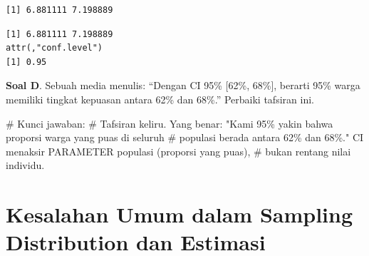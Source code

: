 \documentclass[
  indonesian,
  letterpaper,
]{book}
\newenvironment{Shaded}{\begin{snugshade}}{\end{snugshade}}
\newcommand{\CommentTok}[1]{\textcolor[rgb]{0.37,0.37,0.37}{#1}}
\newcommand{\FunctionTok}[1]{\textcolor[rgb]{0.28,0.35,0.67}{#1}}
\newcommand{\NormalTok}[1]{\textcolor[rgb]{0.00,0.23,0.31}{#1}}
\newcommand{\SpecialCharTok}[1]{\textcolor[rgb]{0.37,0.37,0.37}{#1}}
\begin{document}
\begin{verbatim}
[1] 6.881111 7.198889
\end{verbatim}

\begin{Shaded}
\end{Shaded}

\begin{verbatim}
[1] 6.881111 7.198889
attr(,"conf.level")
[1] 0.95
\end{verbatim}

\textbf{Soal D}. Sebuah media menulis: ``Dengan CI 95\% {[}62\%,
68\%{]}, berarti 95\% warga memiliki tingkat kepuasan antara 62\% dan
68\%.'' Perbaiki tafsiran ini.

\begin{Shaded}
\begin{Highlighting}[]
\CommentTok{\# Kunci jawaban:}
\CommentTok{\# Tafsiran keliru. Yang benar: "Kami 95\% yakin bahwa proporsi warga yang puas di seluruh}
\CommentTok{\# populasi berada antara 62\% dan 68\%." CI menaksir PARAMETER populasi (proporsi yang puas),}
\CommentTok{\# bukan rentang nilai individu.}
\end{Highlighting}
\end{Shaded}


\chapter{Kesalahan Umum dalam Sampling Distribution dan
Estimasi}\label{kesalahan-umum-dalam-sampling-distribution-dan-estimasi}
\end{document}
